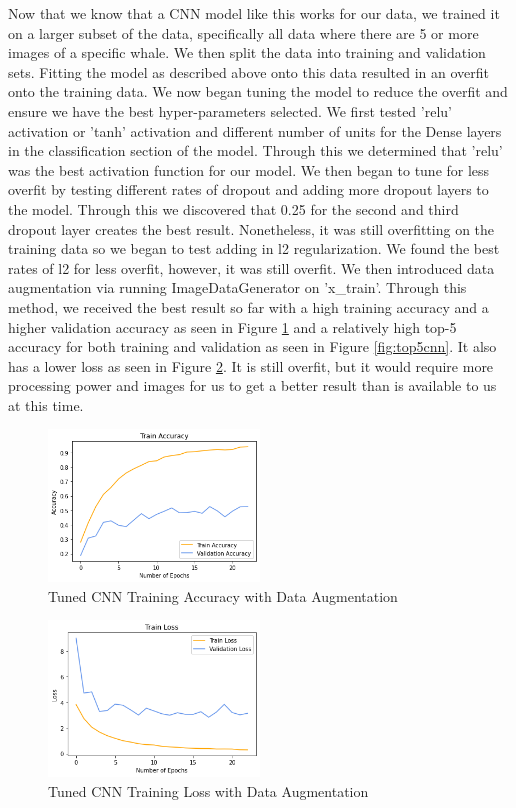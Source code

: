 \documentclass[paper=a4, fontsize=11pt]{scrartcl}
\numberwithin{equation}{section}		%
\numberwithin{table}{section}				%
\begin{document}
Now that we know that a CNN model like this works for our data, we trained it on a larger subset of the data, specifically all data where there are 5 or more images of a specific whale. We then split the data into training and validation sets. Fitting the model as described above onto this data resulted in an overfit onto the training data. We now began tuning the model to reduce the overfit and ensure we have the best hyper-parameters selected. We first tested 'relu' activation or 'tanh' activation and different number of units for the Dense layers in the classification section of the model. Through this we determined that 'relu' was the best activation function for our model. We then began to tune for less overfit by testing different rates of dropout and adding more dropout layers to the model. Through this we discovered that 0.25 for the second and third dropout layer creates the best result. Nonetheless, it was still overfitting on the training data so we began to test adding in l2 regularization. We found the best rates of l2 for less overfit, however, it was still overfit. We then introduced data augmentation via running ImageDataGenerator on 'x\_train'. Through this method, we received the best result so far with a high training accuracy and a higher validation accuracy as seen in Figure \ref{fig:cnn_acc_da} and a relatively high top-5 accuracy for both training and validation as seen in Figure \ref{fig:top5cnn}. It also has a lower loss as seen in Figure \ref{fig:cnn_loss_da}. It is still overfit, but it would require more processing power and images for us to get a better result than is available to us at this time.

\begin{figure}[!h]
    \centering
    \includegraphics[width=0.5\textwidth]{images/cnn_acc_da_l2.png}
    \caption{Tuned CNN Training Accuracy with Data Augmentation}
    \label{fig:cnn_acc_da}
\end{figure}

\begin{figure}[!h]
    \centering
    \includegraphics[width=0.5\textwidth]{images/cnn_loss_da_l2.png}
    \caption{Tuned CNN Training Loss with Data Augmentation}
    \label{fig:cnn_loss_da}
\end{figure}
\end{document}
